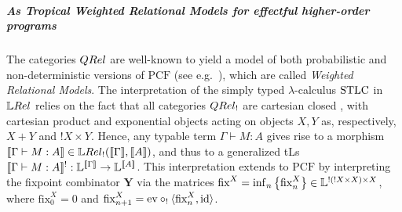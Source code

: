 \subparagraph*{As Tropical Weighted Relational Models for effectful higher-order programs}

The categories $\QREL$ are well-known to yield a model of both probabilistic and non-deterministic versions of $\mathrm{PCF}$ (see e.g.~\cite{Manzo2013, Pagani2018}), which are called \emph{Weighted Relational Models}.
The interpretation of the simply typed $\lambda$-calculus $\mathrm{STLC}$ in $\LREL$ relies on the fact that all categories $\QREL_{!}$ are cartesian closed \cite{Manzo2013}, with cartesian product and exponential objects acting on objects $X,Y$ as, respectively, $X+Y$ and $!X\times Y$. 
Hence, %
any typable term $\Gamma \vdash M:A$ gives rise to a morphism 
$\model{\Gamma \vdash M:A}\in \LREL_{!}(\model{\Gamma}, \model{A})$, and thus to a generalized tLs $\llbracket\Gamma \vdash M:A\rrbracket^{!}:\mathbb{L}^{\llbracket\Gamma\rrbracket}\to \mathbb{L}^{\llbracket A\rrbracket}$. 
This interpretation extends to $\mathrm{PCF}$ by interpreting the fixpoint combinator $\mathbf Y$ via the matrices $\mathrm{fix}^{X}= \inf_{n}\big\{\mathrm{fix}^{X}_{n}\big\} \in \mathbb{L}^{  !(!X\times X) \times X  }$, where 
 $\mathrm{fix}^{X}_{0}=0$ and $\mathrm{fix}^{X}_{n+1}= \mathrm{ev}\circ_{!}\langle \mathrm{fix}_{n}^{X}, \mathrm{id} \rangle $.
 
 


